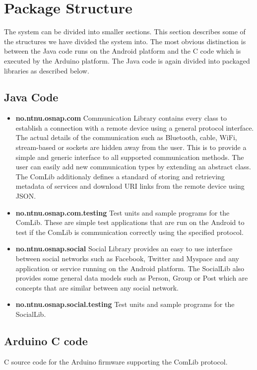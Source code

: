 \section{Package Structure}
The system can be divided into smaller sections. This section describes some of the structures
we have divided the system into. The most obvious distinction is between the Java code runs
on the Android platform and the C code which is executed by the Arduino platform.
The Java code is again divided into packaged libraries as described below.

\subsection{Java Code}
\begin{itemize}
	\item \textbf{no.ntnu.osnap.com}\newline
		Communication Library contains every class to establish a connection with a remote device using a general protocol interface. The actual details of the communication such 			as Bluetooth, cable, WiFi, stream-based or sockets are hidden away from the user. This is to provide a simple and generic interface to all supported communication 				methods. The user can easily add new communication types by extending an abstract class. The ComLib additionaly defines a standard of storing and retrieving metadata
		of services and download URI links from the remote device using JSON.
	\item \textbf{no.ntnu.osnap.com.testing}\newline
		Test units and sample programs for the ComLib. These are simple test applications that are run on the Android to test if the ComLib is communication correctly using the specified
		protocol.
	\item \textbf{no.ntnu.osnap.social}\newline
		Social Library provides an easy to use interface between social networks such as Facebook, Twitter and Myspace and any application or service running on the Android platform.
		The SocialLib also provides some general data models such as Person, Group or Post which are concepts that are similar between any social network. 
	\item \textbf{no.ntnu.osnap.social.testing}  \newline
		Test units and sample programs for the SocialLib.
\end{itemize}

\subsection{Arduino C code}
C source code for the Arduino firmware supporting the ComLib protocol.


